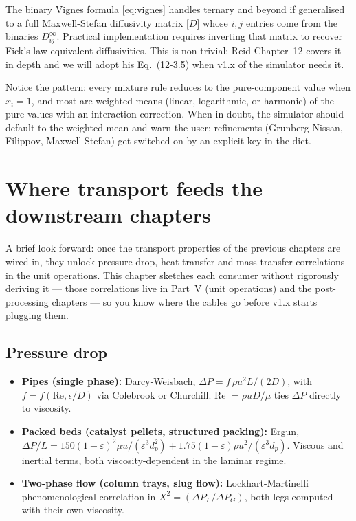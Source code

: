 \documentclass[11pt,a4paper]{article}
\begin{document}
The binary Vignes formula \eqref{eq:vignes} handles ternary and
beyond if generalised to a full Maxwell-Stefan diffusivity matrix
$\bigl[D\bigr]$ whose $i,j$ entries come from the binaries
$D_{ij}^{\infty}$.  Practical implementation requires inverting that
matrix to recover Fick's-law-equivalent diffusivities.  This is
non-trivial; Reid Chapter~12 covers it in depth and we will adopt
his Eq.~(12-3.5) when v1.x of the simulator needs it.

\begin{intuition}
Notice the pattern: every mixture rule reduces to the pure-component
value when $x_i = 1$, and most are weighted means (linear,
logarithmic, or harmonic) of the pure values with an interaction
correction.  When in doubt, the simulator should default to the
weighted mean and warn the user; refinements (Grunberg-Nissan,
Filippov, Maxwell-Stefan) get switched on by an explicit
 key in the dict.
\end{intuition}

\section{Where transport feeds the downstream chapters}\label{ch:transport-roadmap}

\begin{whatyoulllearn}
A brief look forward: once the transport properties of the previous
chapters are wired in, they unlock pressure-drop, heat-transfer and
mass-transfer correlations in the unit operations.  This chapter
sketches each consumer without rigorously deriving it --- those
correlations live in Part~V (unit operations) and the
post-processing chapters --- so you know where the cables go before
v1.x starts plugging them.
\end{whatyoulllearn}

\subsection{Pressure drop}

\begin{itemize}[leftmargin=*,nosep]
  \item \textbf{Pipes (single phase):} Darcy-Weisbach,
        $\Delta P = f\,\rho u^2 L / (2 D)$,
        with $f = f(\mathrm{Re}, \epsilon/D)$ via Colebrook or
        Churchill.  Re $= \rho u D / \mu$ ties $\Delta P$ directly
        to viscosity.
  \item \textbf{Packed beds (catalyst pellets, structured packing):}
        Ergun,
        $\Delta P / L = 150 (1-\varepsilon)^2 \mu u / (\varepsilon^3 d_p^2)
        + 1.75 (1-\varepsilon) \rho u^2 / (\varepsilon^3 d_p)$.
        Viscous and inertial terms, both viscosity-dependent in the
        laminar regime.
  \item \textbf{Two-phase flow (column trays, slug flow):}
        Lockhart-Martinelli phenomenological correlation in $X^2 =
        (\Delta P_L / \Delta P_G)$, both legs computed with their
        own viscosity.
\end{itemize}
\end{document}
